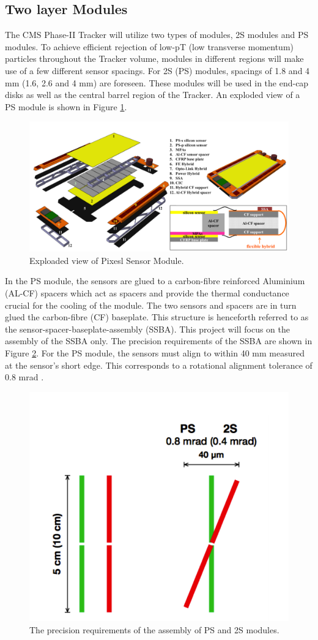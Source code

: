 \subsection{Two layer Modules}

The CMS Phase-II Tracker will utilize two types of modules, 2S modules and PS modules. To achieve efficient rejection of low-pT (low transverse momentum) particles throughout the Tracker volume, modules in different regions will make use of a few different sensor spacings. For 2S (PS) modules, spacings of 1.8 and 4 mm (1.6, 2.6 and 4 mm) are foreseen. These modules will be used in the end-cap disks as well as the central barrel region of the Tracker. An exploded view of a PS module is shown in Figure \ref{fig:ps_exploaded}.
\begin{figure}[ht]\centering
\includegraphics[width=0.8\linewidth]{Data/Introduction/PS_exploaded.png}
\caption{Exploaded view of Pixesl Sensor Module.}
\label{fig:ps_exploaded}
\end{figure}

In the PS module, the sensors are glued to a carbon-fibre reinforced Aluminium (AL-CF) spacers which act as spacers and provide the thermal conductance crucial for the cooling of the module. The two sensors and spacers are in turn glued the carbon-fibre (CF) baseplate. This structure is henceforth referred to as the sensor-spacer-baseplate-assembly (SSBA). This project will focus on the assembly of the SSBA only. The precision requirements of the SSBA are shown in Figure \ref{fig:ps(2s)_precision}. For the PS module, the sensors must align to within 40 mm measured at the sensor’s short edge. This corresponds to a rotational alignment tolerance of 0.8 mrad \cite{AutomatedAssembly_tutorial}.
\begin{figure}[ht]\centering
\includegraphics[width=0.4\linewidth]{Data/Introduction/PS(2S)_precision.png}
\caption{The precision requirements of the assembly of PS
and 2S modules.}
\label{fig:ps(2s)_precision}
\end{figure}

